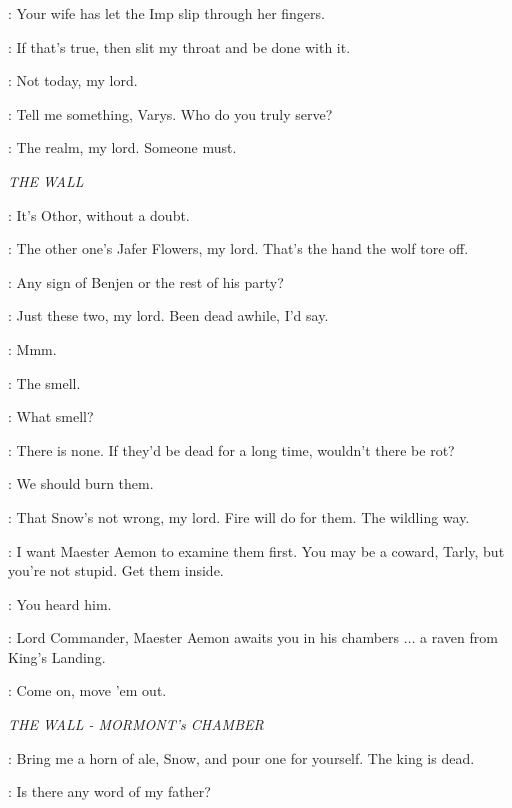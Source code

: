 \VARYS: Your wife has let the Imp slip through her fingers. 

\NED: If that's true, then slit my throat and be done with it. 

\VARYS: Not today, my lord. 

\NED: Tell me something, Varys. Who do you truly serve? 

\VARYS: The realm, my lord. Someone must. 


\scene

\textit{THE WALL}


\JEOR: It's Othor, without a doubt.

\OTHELLYARWYK:  The other one's Jafer Flowers, my lord. That's the hand the wolf tore off. 

\JEOR: Any sign of Benjen or the rest of his party? 

\JON: Just these two, my lord. Been dead awhile, I'd say. 

\JEOR: Mmm. 

\SAM: The smell. 

\OTHELLYARWYK: What smell? 

\SAM: There is none. If they'd be dead for a long time, wouldn't there be rot? 

\JON: We should burn them. 

\OTHELLYARWYK: That Snow's not wrong, my lord. Fire will do for them. The wildling way. 

\JEOR: I want Maester Aemon to examine them first. You may be a coward, Tarly, but you're not stupid. Get them inside. 

\OTHELLYARWYK: You heard him. 


\MESSENGER: Lord Commander, Maester Aemon awaits you in his chambers $\ldots$ a raven from King's Landing. 

\OTHELLYARWYK: Come on, move 'em out. 


\scene

\textit{THE WALL - MORMONT's CHAMBER} 


\JEOR: Bring me a horn of ale, Snow, and pour one for yourself.  The king is dead. 

\JON: Is there any word of my father? 

